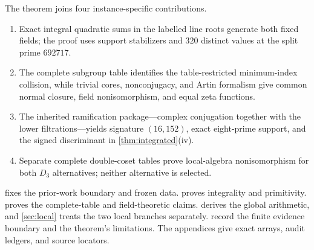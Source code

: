 The theorem joins four instance-specific contributions.
\begin{enumerate}[leftmargin=2.1em]
\item Exact integral quadratic sums in the labelled line roots generate both
fixed fields; the proof uses support stabilizers and $320$ distinct values
at the split prime $692717$.
\item The complete subgroup table identifies the table-restricted
minimum-index collision, while trivial cores, nonconjugacy, and Artin
formalism give common normal closure, field nonisomorphism, and equal zeta
functions.
\item The inherited ramification package---complex conjugation together with
the lower filtrations---yields signature $(16,152)$, exact eight-prime
support, and the signed discriminant in
\cref{thm:integrated}(iv).
\item Separate complete double-coset tables prove local-algebra
nonisomorphism for both $D_3$ alternatives; neither alternative is selected.
\end{enumerate}

 fixes the prior-work boundary and frozen data.
 proves integrality and primitivity.
 proves the complete-table and field-theoretic claims.
 derives the global arithmetic, and
\cref{sec:local} treats the two local branches separately.
 record the finite evidence
boundary and the theorem's limitations.  The appendices give exact arrays,
audit ledgers, and source locators.
